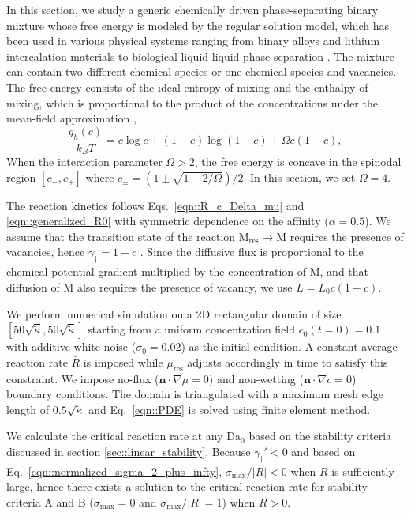 \documentclass[reprint,aps,pre,superscriptaddress]{revtex4-2}
\begin{document}
In this section, we study a generic chemically driven phase-separating binary mixture whose free energy is modeled by the regular solution model, which has been used in various physical systems ranging from binary alloys and lithium intercalation materials to biological liquid-liquid phase separation \cite{CahnJohnE.1958,Bray2002,Bazant2013,Berry2018}. The mixture can contain two different chemical species or one chemical species and vacancies. The free energy consists of the ideal entropy of mixing and the enthalpy of mixing, which is proportional to the product of the concentrations under the mean-field approximation \cite{CahnJohnE.1958},
\begin{equation} \label{eqn::regular_solution}
  \frac{g_h(c)}{k_B T} = c\log{c} + (1-c)\log{(1-c)} + \Omega c(1-c),
\end{equation}
When the interaction parameter $\Omega>2$, the free energy is concave in the spinodal region $[c_-,c_+]$ where $c_\pm = (1\pm \sqrt{1-2/\Omega})/2$. In this section, we set $\Omega = 4$.

The reaction kinetics follows Eqs.~\ref{eqn::R_c_Delta_mu} and \ref{eqn::generalized_R0} with symmetric dependence on the affinity ($\alpha=0.5$). We assume that the transition state of the reaction $\text{M}_\text{res}\to \text{M}$ requires the presence of vacancies, hence $\gamma_\dagger = 1-c$ \cite{Bazant2013}. Since the diffusive flux is proportional to the chemical potential gradient multiplied by the concentration of M, and that diffusion of M also requires the presence of vacancy\cite{Bazant2013}, we use $\tilde{L} = \tilde{L}_0 c(1-c)$.

We perform numerical simulation on a 2D rectangular domain of size $[50\sqrt{\tilde{\kappa}},50\sqrt{\tilde{\kappa}}]$ starting from a uniform concentration field $c_0(t=0)=0.1$ with additive white noise ($\sigma_0=0.02$) as the initial condition. A constant average reaction rate $\bar{R}$ is imposed while $\mu_\text{res}$ adjusts accordingly in time to satisfy this constraint. We impose no-flux ($\mathbf{n} \cdot \nabla \mu=0$) and non-wetting ($\mathbf{n} \cdot \nabla c=0$)\cite{CahnJohnE.1958} boundary conditions. The domain is triangulated with a maximum mesh edge length of $0.5\sqrt{\tilde{\kappa}}$ and Eq.~\ref{eqn::PDE} is solved using finite element method.

We calculate the critical reaction rate at any $\text{Da}_0$ based on the stability criteria discussed in section \ref{sec::linear_stability}. Because $\gamma_\dagger'<0$ and based on Eq.~\ref{eqn::normalized_sigma_2_plus_infty}, $\sigma_\text{max}/|R|<0$ when $R$ is sufficiently large, hence there exists a solution to the critical reaction rate for stability criteria A and B ($\sigma_\text{max}=0$ and $\sigma_\text{max}/|R|=1$) when $R>0$.
\end{document}
